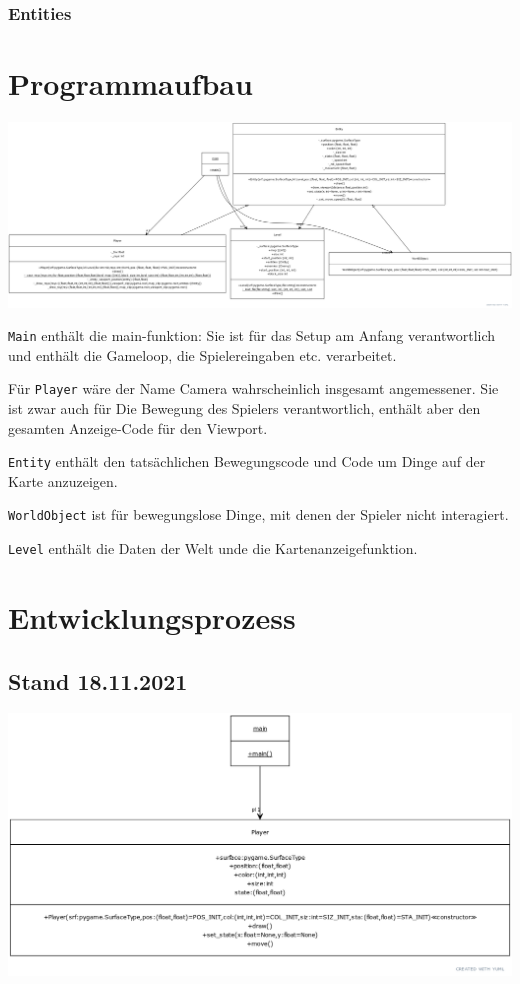 \documentclass[a4paper,titlepage]{article}
\begin{document}
\subsubsection*{Entities}

\newpage

\section{Programmaufbau}
\includegraphics[scale=0.3]{./img/yuml-final}

\verb|Main| enthält die main-funktion: Sie ist für das Setup am Anfang verantwortlich und enthält die Gameloop, die Spielereingaben etc. verarbeitet.

Für \verb|Player| wäre der Name Camera wahrscheinlich insgesamt angemessener. Sie ist zwar auch für Die Bewegung des Spielers verantwortlich, enthält aber
den gesamten Anzeige-Code für den Viewport.

\verb|Entity| enthält den tatsächlichen Bewegungscode und Code um Dinge auf der Karte anzuzeigen.

\verb|WorldObject| ist für bewegungslose Dinge, mit denen der Spieler nicht interagiert.

\verb|Level| enthält die Daten der Welt unde die Kartenanzeigefunktion.


\newpage

\section{Entwicklungsprozess}


\subsection{Stand 18.11.2021}

\includegraphics[scale=0.34]{./img/yuml-1}
\end{document}
